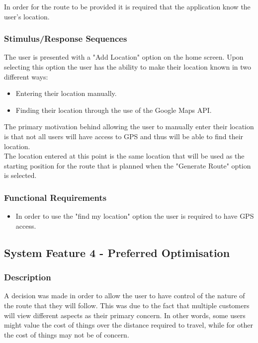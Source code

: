 \documentclass[10pt, a4paper, onecolumn]{scrartcl}
\begin{document}
				In order for the route to be provided it is required that the application know the user's location. 
				
			\subsubsection{Stimulus/Response Sequences}
			
				The user is presented with a "Add Location" option on the home screen. Upon selecting this option the user has the ability to make their location known in two different ways:
				
				\begin{itemize}
					\item Entering their location manually.
					\item Finding their location through the use of the Google Maps API.
				\end{itemize}
				
				The primary motivation behind allowing the user to manually enter their location is that not all users will have access to GPS and thus will be able to find their location.\\
				
				The location entered at this point is the same location that will be used as the starting position for the route that is planned when the "Generate Route" option is selected.
				
			\subsubsection{Functional Requirements}
			
				\begin{itemize}
					\item In order to use the "find my location" option the user is required to have GPS access.
				\end{itemize}
				
		\subsection{System Feature 4 - Preferred Optimisation}
		
			\subsubsection{Description}
			
				A decision was made in order to allow the user to have control of the nature of the route that they will follow. This was due to the fact that multiple customers will view different aspects as their primary concern. In other words, some users might value the cost of things over the distance required to travel, while for other the cost of things may not be of concern.
			
\end{document}
